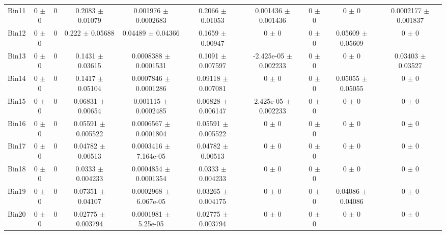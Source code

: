 \begin{tabular}{@{\extracolsep{4pt}}lccccccccc@{}}
     Bin11 & 0 $\pm$ 0 & 0 & 0.2083 $\pm$ 0.01079 & 0.001976 $\pm$ 0.0002683 & 0.2066 $\pm$ 0.01053 & 0.001436 $\pm$ 0.001436 & 0 $\pm$ 0 & 0 $\pm$ 0 & 0.0002177 $\pm$ 0.001837 \\ 
     Bin12 & 0 $\pm$ 0 & 0 & 0.222 $\pm$ 0.05688 & 0.04489 $\pm$ 0.04366 & 0.1659 $\pm$ 0.00947 & 0 $\pm$ 0 & 0 $\pm$ 0 & 0.05609 $\pm$ 0.05609 & 0 $\pm$ 0 \\ 
     Bin13 & 0 $\pm$ 0 & 0 & 0.1431 $\pm$ 0.03615 & 0.0008388 $\pm$ 0.0001531 & 0.1091 $\pm$ 0.007597 & -2.425e-05 $\pm$ 0.002233 & 0 $\pm$ 0 & 0 $\pm$ 0 & 0.03403 $\pm$ 0.03527 \\ 
     Bin14 & 0 $\pm$ 0 & 0 & 0.1417 $\pm$ 0.05104 & 0.0007846 $\pm$ 0.0001286 & 0.09118 $\pm$ 0.007081 & 0 $\pm$ 0 & 0 $\pm$ 0 & 0.05055 $\pm$ 0.05055 & 0 $\pm$ 0 \\ 
     Bin15 & 0 $\pm$ 0 & 0 & 0.06831 $\pm$ 0.00654 & 0.001115 $\pm$ 0.0002485 & 0.06828 $\pm$ 0.006147 & 2.425e-05 $\pm$ 0.002233 & 0 $\pm$ 0 & 0 $\pm$ 0 & 0 $\pm$ 0 \\ 
     Bin16 & 0 $\pm$ 0 & 0 & 0.05591 $\pm$ 0.005522 & 0.0006567 $\pm$ 0.0001804 & 0.05591 $\pm$ 0.005522 & 0 $\pm$ 0 & 0 $\pm$ 0 & 0 $\pm$ 0 & 0 $\pm$ 0 \\ 
     Bin17 & 0 $\pm$ 0 & 0 & 0.04782 $\pm$ 0.00513 & 0.0003416 $\pm$ 7.164e-05 & 0.04782 $\pm$ 0.00513 & 0 $\pm$ 0 & 0 $\pm$ 0 & 0 $\pm$ 0 & 0 $\pm$ 0 \\ 
     Bin18 & 0 $\pm$ 0 & 0 & 0.0333 $\pm$ 0.004233 & 0.0004854 $\pm$ 0.0001354 & 0.0333 $\pm$ 0.004233 & 0 $\pm$ 0 & 0 $\pm$ 0 & 0 $\pm$ 0 & 0 $\pm$ 0 \\ 
     Bin19 & 0 $\pm$ 0 & 0 & 0.07351 $\pm$ 0.04107 & 0.0002968 $\pm$ 6.067e-05 & 0.03265 $\pm$ 0.004175 & 0 $\pm$ 0 & 0 $\pm$ 0 & 0.04086 $\pm$ 0.04086 & 0 $\pm$ 0 \\ 
     Bin20 & 0 $\pm$ 0 & 0 & 0.02775 $\pm$ 0.003794 & 0.0001981 $\pm$ 5.25e-05 & 0.02775 $\pm$ 0.003794 & 0 $\pm$ 0 & 0 $\pm$ 0 & 0 $\pm$ 0 & 0 $\pm$ 0 \\ 
\hline\hline
  \end{tabular}
